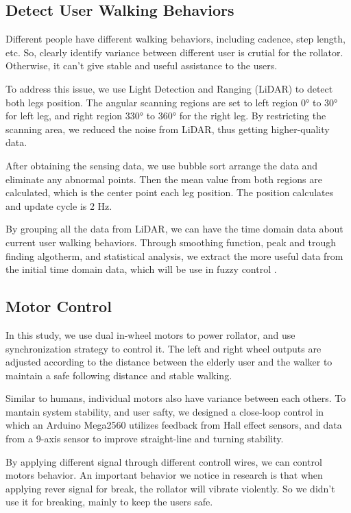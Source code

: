\documentclass[conference]{IEEEtran}
\begin{document}
\subsection {Detect User Walking Behaviors}
Different people have different walking behaviors, including cadence, step length, etc. 
So, clearly identify variance between different user is crutial for the rollator. Otherwise, it can't give stable and useful assistance to the users.

To address this issue, we use Light Detection and Ranging (LiDAR) to detect both legs position. 
The angular scanning regions are set to left region 0° to 30° for left leg, and right region 330° to 360° for the right leg. 
By restricting the scanning area, we reduced the noise from LiDAR, thus getting higher-quality data.

After obtaining the sensing data, we use bubble sort arrange the data and eliminate any abnormal points. 
Then the mean value from both regions are calculated, which is the center point each leg position. 
The position calculates and update cycle is 2 Hz.

By grouping all the data from LiDAR, we can have the time domain data about current user walking behaviors.
Through smoothing function, peak and trough finding algotherm, and statistical analysis, we extract the more useful data from the initial time domain data, which will be use in fuzzy control \cite{b2}.

\subsection {Motor Control}
﻿In this study, we use dual in-wheel motors to power rollator, and use synchronization strategy to control it. 
The left and right wheel outputs are adjusted according to the distance between the elderly user and the walker to maintain a safe following distance and stable walking.

Similar to humans, individual motors also have variance between each others. 
To mantain system stability, and user safty, we designed a close-loop control in which an Arduino Mega2560 utilizes feedback from Hall effect sensors, and data from a 9-axis sensor to improve straight-line and turning stability.

By applying different signal through different controll wires, we can control motors behavior.
An important behavior we notice in research is that when applying rever signal for break, the rollator will vibrate violently. 
So we didn't use it for breaking, mainly to keep the users safe.
\end{document}
